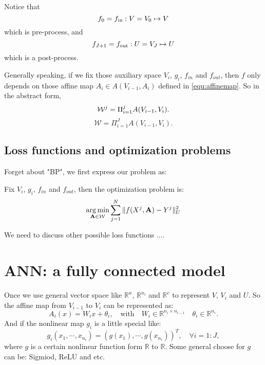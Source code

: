Notice that
$$
f_0=f_{\rm in}: V=V_0\mapsto V
$$
which is pre-process, and
$$
f_{J+1}=f_{\rm out}: U=V_{J}\mapsto U
$$
which is a post-process.

Generally speaking, if we fix those auxiliary space $V_i$, $g_i$, $f_{in}$ and $f_{out}$, then $f$ only depends on those affine map $A_i \in A(V_{i-1}, A_{i})$ defined in \ref{equ:affinemap}.  So in the abstract form,
\begin{equation}
{\cal W}^j = \Pi_{i=1}^j A(V_{i-1}, V_i).
\end{equation}
\begin{equation}
\mathcal{W} = \Pi_{i=1}^J A(V_{i-1}, V_i).
\end{equation}

\subsection{Loss functions and optimization problems}
Forget about "BP", we first express our problem as:
\begin{problem}Fix $V_i$, $g_i$, $f_{in}$ and $f_{out}$, then the optimization problem is:
\begin{equation}
\mathop{\arg\min}_{{\mathbf A}\in {\cal W}} \sum_{j=1}^N \| f(X^j, {\mathbf A}) - Y^j \|^2_{U}
\end{equation}
\end{problem}

We need to discuss other possible loss functions ....


\section{ANN: a fully connected model}
Once we use general vector space like $\mathbb{R}^n$, $\mathbb{R}^{n_i}$ and $\mathbb{R}^c$ to represent $V$, $V_i$ and $U$. So the affine map from $V_{i-1}$ to $V_i$ can be represented as: 
\begin{equation}
A_i(x) = W_i x + \theta_i, \quad \text{with} \quad W_i \in \mathbb{R}^{n_i \times n_{i-1}} \quad \theta_i \in \mathbb{R}^{n_i}.
\end{equation}
And if the nonlinear map $g_i$ is a little special like:
\begin{equation}
g_i(x_1, \cdots, x_{n_i}) = (g(x_1), \cdots, g(x_{n_i}))^T, \quad \forall i = 1:J,
\end{equation}
where $g$ is a certain nonlinear function form $\mathbb{R}$ to $\mathbb{R}$. Some general choose for $g$ can be: Sigmiod, ReLU and etc.

